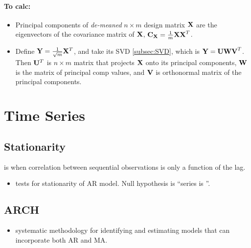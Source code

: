 \documentclass[11pt]{article}
\begin{document}
\paragraph{To calc:}
\begin{itemize}
  \item {} Principal components of \emph{de-meaned} $n \times m$
  design matrix $\mathbf{X}$ are the eigenvectors of the covariance matrix of $\mathbf{X}$,
  $\mathbf{C_X} = \frac{1}{m}\mathbf{XX}^T$.
  \item {} Define $\mathbf{Y} = \frac{1}{\sqrt{m}}\mathbf{X}^T$, and take its SVD
  \ref{subsec:SVD}, which is $\mathbf{Y} = \mathbf{UWV}^T$. Then $\mathbf{U}^T$ is $n \times m$
  matrix that projects $\mathbf{X}$ onto its principal components, $\mathbf{W}$ is the matrix
  of principal comp values, and $\mathbf{V}$ is orthonormal matrix of the principal
  components. 
\end{itemize}



\section{Time Series}
\label{sec:timeseries}
\subsection{Stationarity}

\begin{definition} is when correlation between sequential
  observations is only a function of the lag.
\end{definition}

\begin{itemize}
  \item {} tests for stationarity of AR model. Null hypothesis is
  ``series is ''.
\end{itemize}

\subsection{ARCH}
\begin{itemize}
  \item{ systematic methodology for identifying and estimating models
    that can incorporate both AR and MA.}
\end{itemize}
\end{document}
